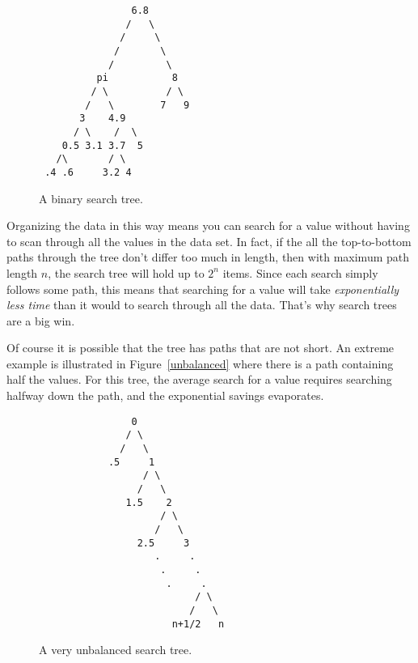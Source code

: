 \begin{definition}
\begin{figure}

\begin{center}
\begin{verbatim}
                6.8
               /   \
              /     \
             /       \
            /         \
          pi           8  
         / \          / \
        /   \        7   9
       3    4.9  
      / \    /  \
    0.5 3.1 3.7  5
   /\       / \
 .4 .6     3.2 4 
\end{verbatim}
\end{center}

\caption{A binary search tree.}

\label{searchtree1}

\end{figure}

Organizing the data in this way means you can search for a value
without having to scan through all the values in the data set.  In
fact, if the all the top-to-bottom paths through the tree don't differ
too much in length, then with maximum path length $n$, the search tree
will hold up to $2^n$ items.  Since each search simply follows some
path, this means that searching for a value will take
\emph{exponentially less time} than it would to search through all the
data.  That's why search trees are a big win.

Of course it is possible that the tree has paths that are not short.
An extreme example is illustrated in Figure~\ref{unbalanced} where
there is a path containing half the values.  For this tree, the
average search for a value requires searching halfway down the path,
and the exponential savings evaporates.

\begin{figure}

\begin{center}
\begin{verbatim}
                0
               / \
              /   \
            .5     1
                  / \
                 /   \
               1.5    2
                     / \
                    /   \
                 2.5     3  
                    .     .
                     .     .
                      .     .
                           / \
                          /   \
                       n+1/2   n  
\end{verbatim}   
\end{center}

\caption{A very unbalanced search tree.}


\end{figure}
\end{definition}

